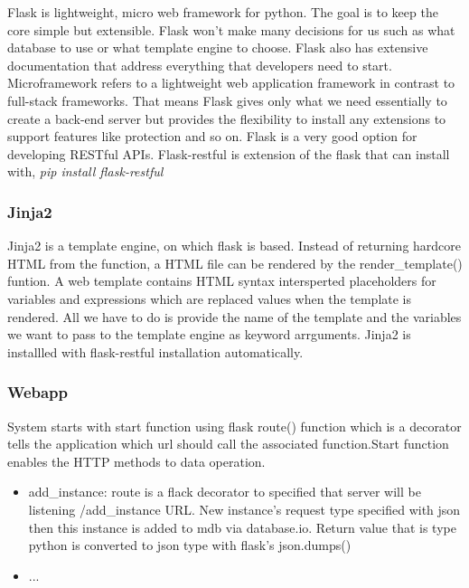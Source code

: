 \documentclass[12pt,twoside]{article}
\newcommand\tab[1][1cm]{\hspace*{#1}}
\begin{document}
		\par Flask is lightweight, micro web framework for python. The goal is to keep the core simple but extensible. Flask won't make many decisions for us such as what database to use or what template engine to choose. Flask also has extensive documentation that address everything that developers need to start. Microframework refers to a lightweight web application framework in contrast to full-stack frameworks. That means Flask gives only what we need essentially to create a back-end server but provides the flexibility to install any extensions to support features like protection and so on. Flask is a very good option for developing RESTful APIs.
		\newline \newline
		Flask-restful is extension of the flask that can install with,
		\newline
		\tab \textit{pip install flask-restful}
		
		
		
		\subsubsection*{Jinja2}
		
		\par Jinja2 is a template engine, on which flask is based. Instead of returning hardcore HTML from the function, a HTML file can be rendered by the render\_template() funtion. A web template contains HTML syntax intersperted placeholders for variables and expressions which are replaced values when the template is rendered. All we have to do is provide the name of the template and the variables we want to pass to the template engine as keyword arrguments.
		\newline\newline
		Jinja2 is installled with flask-restful installation automatically.
		
		\subsubsection*{Webapp}
		
		\par System starts with start function using flask route() function which is a  decorator tells the application which url should call the associated function.Start function enables the HTTP methods to data operation.
		
		\begin{itemize}
			\item add\_instance: route is a flack decorator to specified that server will be listening /add\_instance URL. New instance's request type specified with json then this instance is added to mdb via database.io. Return value that is type python is converted to json type with flask's json.dumps()
			\item ...
		\end{itemize}
		 
\end{document}
